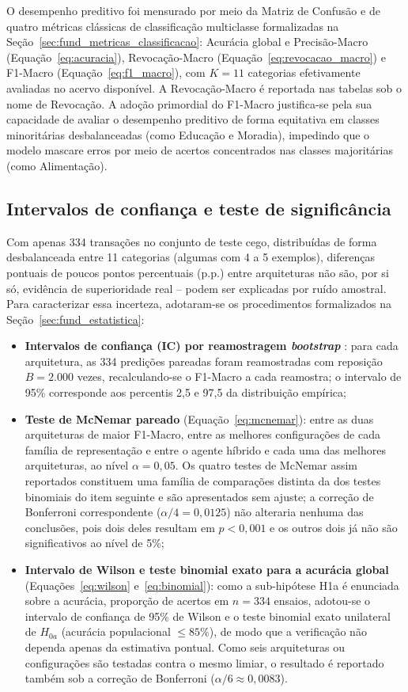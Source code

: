 O desempenho preditivo foi mensurado por meio da Matriz de Confusão e de quatro métricas clássicas de classificação multiclasse formalizadas na Seção~\ref{sec:fund_metricas_classificacao}: Acurácia global e Precisão-Macro (Equação~\ref{eq:acuracia}), Revocação-Macro (Equação~\ref{eq:revocacao_macro}) e F1-Macro (Equação~\ref{eq:f1_macro}), com $K = 11$ categorias efetivamente avaliadas no acervo disponível. A Revocação-Macro é reportada nas tabelas sob o nome de Revocação. A adoção primordial do F1-Macro justifica-se pela sua capacidade de avaliar o desempenho preditivo de forma equitativa em classes minoritárias desbalanceadas (como Educação e Moradia), impedindo que o modelo mascare erros por meio de acertos concentrados nas classes majoritárias (como Alimentação).

\subsection{Intervalos de confiança e teste de significância}
\label{sec:val_significancia}
Com apenas 334 transações no conjunto de teste cego, distribuídas de forma desbalanceada entre 11 categorias (algumas com 4 a 5 exemplos), diferenças pontuais de poucos pontos percentuais (p.p.) entre arquiteturas não são, por si só, evidência de superioridade real -- podem ser explicadas por ruído amostral. Para caracterizar essa incerteza, adotaram-se os procedimentos formalizados na Seção~\ref{sec:fund_estatistica}:
\begin{itemize}
	\item \textbf{Intervalos de confiança (IC) por reamostragem \textit{bootstrap}} \cite{efron1979bootstrap}: para cada arquitetura, as 334 predições pareadas foram reamostradas com reposição $B = 2.000$ vezes, recalculando-se o F1-Macro a cada reamostra; o intervalo de 95\% corresponde aos percentis 2,5 e 97,5 da distribuição empírica;
	\item \textbf{Teste de McNemar pareado} \cite{mcnemar1947note} (Equação~\ref{eq:mcnemar}): entre as duas arquiteturas de maior F1-Macro, entre as melhores configurações de cada família de representação e entre o agente híbrido e cada uma das melhores arquiteturas, ao nível $\alpha = 0{,}05$. Os quatro testes de McNemar assim reportados constituem uma família de comparações distinta da dos testes binomiais do item seguinte e são apresentados sem ajuste; a correção de Bonferroni correspondente ($\alpha/4 = 0{,}0125$) não alteraria nenhuma das conclusões, pois dois deles resultam em $p < 0{,}001$ e os outros dois já não são significativos ao nível de 5\%;
	\item \textbf{Intervalo de Wilson e teste binomial exato para a acurácia global} \cite{wilson1927probable} (Equações~\ref{eq:wilson} e~\ref{eq:binomial}): como a sub-hipótese H1a é enunciada sobre a acurácia, proporção de acertos em $n = 334$ ensaios, adotou-se o intervalo de confiança de 95\% de Wilson e o teste binomial exato unilateral de $H_{0a}$ (acurácia populacional $\le 85\%$), de modo que a verificação não dependa apenas da estimativa pontual. Como seis arquiteturas ou configurações são testadas contra o mesmo limiar, o resultado é reportado também sob a correção de Bonferroni ($\alpha/6 \approx 0{,}0083$).
\end{itemize}
